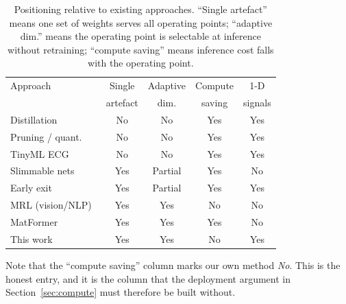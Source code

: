 \begin{table}[!t]
\centering
\caption{Positioning relative to existing approaches. ``Single artefact''
means one set of weights serves all operating points; ``adaptive dim.'' means
the operating point is selectable at inference without retraining;
``compute saving'' means inference cost falls with the operating point.}
\label{tab:related}
\small
\begin{tabular}{lcccc}
\toprule
Approach & Single & Adaptive & Compute & 1-D \\
         & artefact & dim. & saving & signals \\
\midrule
Distillation~\cite{hinton2015}      & No  & No      & Yes & Yes \\
Pruning / quant.~\cite{han2016,jacob2018} & No & No & Yes & Yes \\
TinyML ECG~\cite{sakr2023}          & No  & No      & Yes & Yes \\
Slimmable nets~\cite{yu2019}        & Yes & Partial & Yes & No  \\
Early exit~\cite{teerapittayanon2016} & Yes & Partial & Yes & Yes \\
MRL (vision/NLP)~\cite{kusupati2022} & Yes & Yes    & No  & No  \\
MatFormer~\cite{kudugunta2023}      & Yes & Yes     & Yes & No  \\
\midrule
This work                           & Yes & Yes     & No  & Yes \\
\bottomrule
\end{tabular}
\end{table}

Note that the ``compute saving'' column marks our own method \emph{No}. This
is the honest entry, and it is the column that the deployment argument in
Section~\ref{sec:compute} must therefore be built without.
